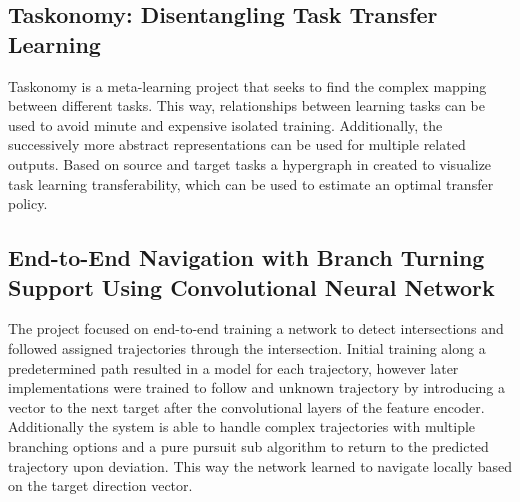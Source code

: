 \documentclass[sigconf]{acmart}
\begin{document}
\subsection{Taskonomy: Disentangling Task Transfer Learning \cite{Taskonomy}}
Taskonomy is a meta-learning project that seeks to find the complex mapping between different tasks.
This way, relationships between learning tasks can be used to avoid minute and expensive isolated training.
Additionally, the successively more abstract representations can be used for multiple related outputs.
Based on source and target tasks a hypergraph in created to visualize task learning transferability, which can be used to estimate an optimal transfer policy.

\subsection{End-to-End Navigation with Branch Turning Support Using Convolutional Neural Network \cite{E2ENavigation}}
The project focused on end-to-end training a network to detect intersections and followed assigned trajectories through the intersection.
Initial training along a predetermined path resulted in a model for each trajectory, however later implementations were trained to follow and unknown trajectory by introducing a vector to the next target after the convolutional layers of the feature encoder.
Additionally the system is able to handle complex trajectories with multiple branching options and a pure pursuit sub algorithm to return to the predicted trajectory upon deviation.
This way the network learned to navigate locally based on the target direction vector.
\end{document}
